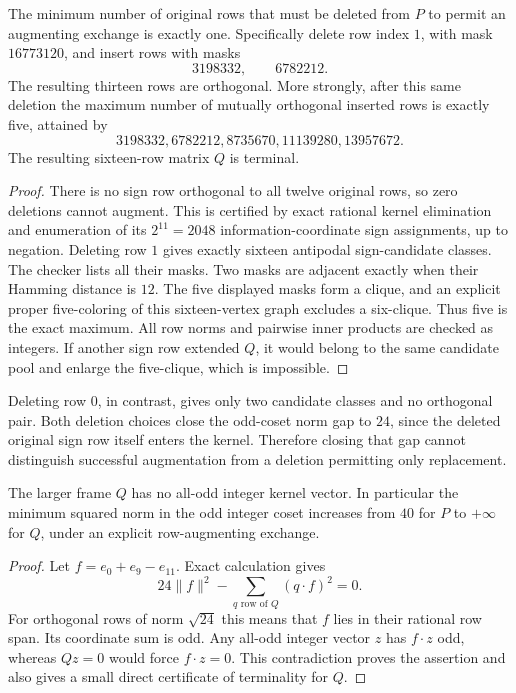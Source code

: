 \begin{proposition}
The minimum number of original rows that must be deleted from $P$
to permit an augmenting exchange is exactly one. Specifically delete
row index $1$, with mask $16773120$, and insert rows with masks
\[
3198332,\qquad6782212.
\]
The resulting thirteen rows are orthogonal. More strongly, after this
same deletion the maximum number of mutually orthogonal inserted
rows is exactly five, attained by
\[
3198332,6782212,8735670,11139280,13957672.
\]
The resulting sixteen-row matrix $Q$ is terminal.
\end{proposition}
\begin{proof}
There is no sign row orthogonal to all twelve original rows, so zero
deletions cannot augment. This is certified by exact rational kernel
elimination and enumeration of its $2^{11}=2048$ information-coordinate
sign assignments, up to negation.
Deleting row $1$ gives exactly sixteen antipodal sign-candidate classes.
The checker lists all their masks. Two masks are adjacent exactly when
their Hamming distance is $12$. The five displayed masks form a clique,
and an explicit proper five-coloring of this sixteen-vertex graph
excludes a six-clique. Thus five is the exact maximum. All row norms and pairwise
inner products are checked as integers.
If another sign row extended $Q$, it would belong to the same candidate
pool and enlarge the five-clique, which is impossible.
\end{proof}

Deleting row $0$, in contrast, gives only two candidate classes and
no orthogonal pair. Both deletion choices close the odd-coset norm gap
to $24$, since the deleted original sign row itself enters the kernel.
Therefore closing that gap cannot distinguish successful augmentation
from a deletion permitting only replacement.

\begin{proposition}
The larger frame $Q$ has no all-odd integer kernel vector. In particular
the minimum squared norm in the odd integer coset increases from
$40$ for $P$ to $+\infty$ for $Q$, under an explicit row-augmenting
exchange.
\end{proposition}
\begin{proof}
Let $f=e_0+e_9-e_{11}$. Exact calculation gives
\[
 24\|f\|^2-\sum_{q\text{ row of }Q}(q\cdot f)^2=0.
\]
For orthogonal rows of norm $\sqrt{24}$ this means that $f$ lies in
their rational row span. Its coordinate sum is odd. Any all-odd integer
vector $z$ has $f\cdot z$ odd, whereas $Qz=0$ would force
$f\cdot z=0$. This contradiction proves the assertion and also gives
a small direct certificate of terminality for $Q$.
\end{proof}

